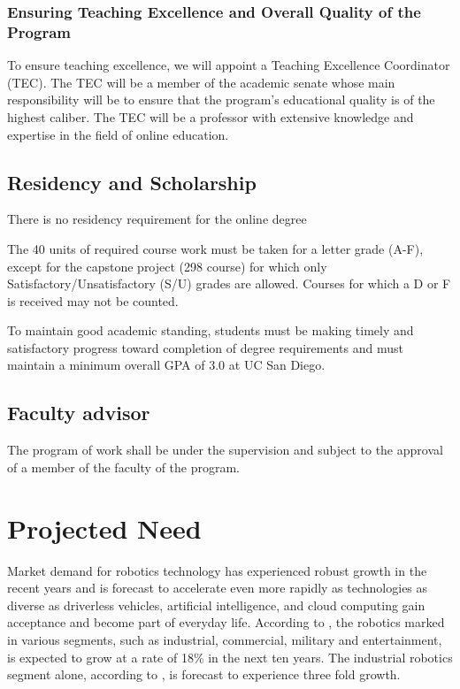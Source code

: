 \documentclass[11pt,letterpaper]{article}
\begin{document}
\subsubsection{Ensuring Teaching Excellence and Overall Quality of the Program}

To ensure teaching excellence, we will appoint a Teaching Excellence
Coordinator (TEC). The TEC will be a member of the academic senate
whose main responsibility will be to ensure that the program’s
educational quality is of the highest caliber. The TEC will be a
professor with extensive knowledge and expertise in the field of
online education.


\subsection{Residency and Scholarship}

There is no residency requirement for the online degree 

The 40 units of required course work must be taken for a letter grade
(A-F), except for the capstone project (298 course) for which only
Satisfactory/Unsatisfactory (S/U) grades are allowed. Courses for
which a D or F is received may not be counted.

To maintain good academic standing, students must be making timely and
satisfactory progress toward completion of degree requirements and
must maintain a minimum overall GPA of 3.0 at UC San Diego.

\subsection{Faculty advisor}

The program of work shall be under the supervision and subject to the
approval of a member of the faculty of the program.


\section{Projected Need}
\label{Sec:ProjectedNeed}

Market demand for robotics technology has experienced robust growth in
the recent years and is forecast to accelerate even more rapidly as
technologies as diverse as driverless vehicles, artificial
intelligence, and cloud computing gain acceptance and become part of
everyday life. According to \cite{murphy2017}, the robotics marked in
various segments, such as industrial, commercial, military and
entertainment, is expected to grow at a rate of 18\% in the next ten
years. The industrial robotics segment alone, according to \cite{glaser2017},
is forecast to experience three fold growth.
\end{document}
